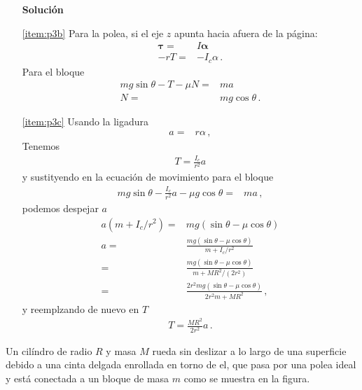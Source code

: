   \begin{itemize}
  \item[\textbf{Solución}]
  \item[\ref{item:p3b}] 
    Para la polea, si el eje $z$ apunta hacia afuera de la página:
    \begin{align*}
      \boldsymbol{\tau}=&I\boldsymbol{\alpha}\nonumber\\
      -rT=&-I_c\alpha\,.
    \end{align*}
    Para el bloque
    \begin{align*}
      mg\sin\theta-T-\mu N=&m a\nonumber\\
      N=&mg\cos\theta\,.
    \end{align*}
  \item[\ref{item:p3c}]
    Usando la ligadura
    \begin{align*}
      a=&r\alpha\,,
    \end{align*}
    Tenemos
    \begin{align*}
      T=\frac{I_c}{r^2}a
    \end{align*}
    y sustityendo en la ecuación de movimiento para el bloque
    \begin{align*}
      mg\sin\theta-\frac{I_c}{r^2}a-\mu g \cos\theta=&ma\,,
    \end{align*}
    podemos despejar $a$
    \begin{align*}
      a(m+I_c/r^2)=&mg(\sin\theta-\mu\cos\theta)\nonumber\\
      a=&\frac{mg(\sin\theta-\mu\cos\theta)}{m+I_c/r^2}\nonumber\\
      =&\frac{mg(\sin\theta-\mu\cos\theta)}{m+MR^2/(2r^2)}\nonumber\\
      =&\frac{2r^2mg(\sin\theta-\mu\cos\theta)}{2r^2m+MR^2}\,,
    \end{align*}
    y reemplzando de nuevo en $T$
    \begin{align*}
      T=\frac{MR^2}{2r^2}a\,.
    \end{align*}

  \end{itemize}

\ejemplo{}
 Un cilíndro de radio $R$ y masa $M$ rueda sin deslizar a lo largo
    de una superficie debido a una cinta delgada enrollada en torno de
    el, que pasa por una polea ideal y está conectada a un bloque de
    masa $m$ como se muestra en la figura.


